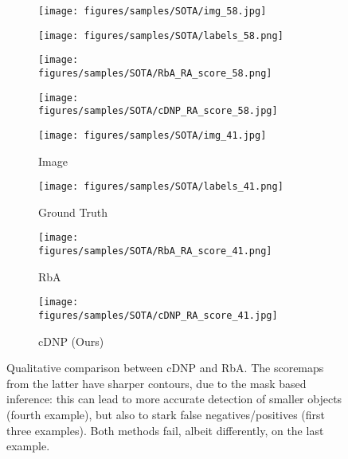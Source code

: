 \documentclass[10pt,twocolumn,letterpaper]{article}
\begin{document}
\begin{figure}[h!]
    \begin{subfigure}[b]{0.10\textwidth}
        \centering
        \texttt{[image: figures/samples/SOTA/img\_58.jpg]}
    \end{subfigure}
    \begin{subfigure}[b]{0.10\textwidth}
        \centering
        \texttt{[image: figures/samples/SOTA/labels\_58.png]}
    \end{subfigure}
    \begin{subfigure}[b]{0.10\textwidth}
        \centering
        \texttt{[image: figures/samples/SOTA/RbA\_RA\_score\_58.png]}
    \end{subfigure}
    \begin{subfigure}[b]{0.10\textwidth}
        \centering
        \texttt{[image: figures/samples/SOTA/cDNP\_RA\_score\_58.jpg]}
    \end{subfigure}
    
    \begin{subfigure}[b]{0.10\textwidth}
        \centering
        \texttt{[image: figures/samples/SOTA/img\_41.jpg]}
        \caption*{\scriptsize Image}
    \end{subfigure}
    \begin{subfigure}[b]{0.10\textwidth}
        \centering
        \texttt{[image: figures/samples/SOTA/labels\_41.png]}
        \caption*{\scriptsize Ground Truth}
    \end{subfigure}
    \begin{subfigure}[b]{0.10\textwidth}
        \centering
        \texttt{[image: figures/samples/SOTA/RbA\_RA\_score\_41.png]}
        \caption*{\scriptsize RbA}
    \end{subfigure}
    \begin{subfigure}[b]{0.10\textwidth}
        \centering
        \texttt{[image: figures/samples/SOTA/cDNP\_RA\_score\_41.jpg]}
        \caption*{\scriptsize cDNP (Ours)}
    \end{subfigure}
    
    \caption{Qualitative comparison between cDNP and RbA. The scoremaps from the latter have sharper contours, due to the mask based inference: this can lead to more accurate detection of smaller objects (fourth example), but also to stark false negatives/positives (first three examples). Both methods fail, albeit differently, on the last example.}
    \label{fig:sota}
\end{figure} 
\end{document}

